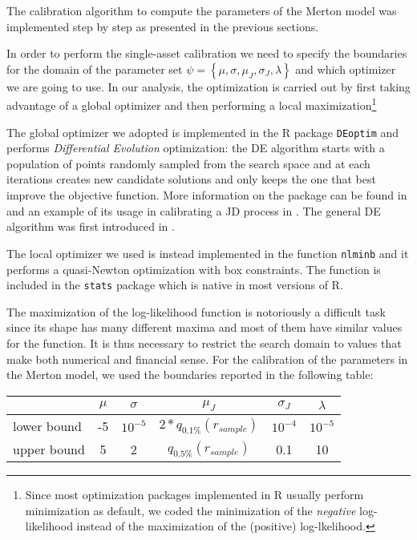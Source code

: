 The calibration algorithm to compute the parameters of the Merton model was implemented step by step as presented in the previous sections.

In order to perform the single-asset calibration we need to specify the boundaries for the domain of the parameter set $\psi =  \left\{ \mu, \sigma, \mu_J, \sigma_J, \lambda \right\}$ and which optimizer we are going to use.
In our analysis, the optimization is carried out by first taking advantage of a global optimizer and then performing a local maximization\footnote{Since most optimization packages implemented in R usually perform minimization as default, we coded the minimization of the \textit{negative} log-likelihood instead of the maximization of the (positive) log-lkelihood.}

The global optimizer we adopted is implemented in the R package \texttt{DEoptim} and performs \textit{Differential Evolution} optimization: the DE algorithm starts with a population of points randomly sampled from the search space and at each iterations creates new candidate solutions and only keeps the one that best improve the objective function. More information on the package can be found in \citep{DEoptim_manual} and an example of its usage in calibrating a JD process in \citep{DEoptim_jumpdiffusion}. The general DE algorithm was first introduced in \citep{DEoptim_book}.

The local optimizer we used is instead implemented in the function \texttt{nlminb} and it performs a quasi-Newton optimization with box constraints. The function is included in the \texttt{stats} package which is native in most versions of R.

\bigskip
The maximization of the log-likelihood function is notoriously a difficult task since its shape has many different maxima and most of them have similar values for the function. It is thus necessary to restrict the search domain to values that make both numerical and financial sense.
For the calibration of the parameters in the Merton model, we used the  boundaries reported in the following table:
\bigskip

\begin{center}
	\begin{tabular}{lccccc}
		
		&$\mu$ & $\sigma$ & $\mu_J$ & $\sigma_J$ & $\lambda$ \\
		\midrule
		lower bound & -5 & $10^{-5}$ & $2*q_{0.1\%}(r_{sample})$ &$10^{-4}$ &$10^{-5}$\\
		upper bound & 5 & 2 & $q_{0.5\%}(r_{sample})$ & 0.1& 10\\
		\midrule
	\end{tabular}
\end{center}


